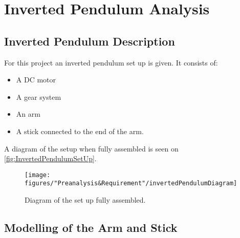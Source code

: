 \chapter{Inverted Pendulum Analysis}


\section{Inverted Pendulum Description}\label{sec:IPDesc}
For this project an inverted pendulum set up is given. It consists of:
\begin{itemize}
	\item A DC motor
	\item A gear system
	\item An arm
	\item A stick connected to the end of the arm.
\end{itemize}
A diagram of the setup when fully assembled is seen on \autoref{fig:InvertedPendulumSetUp}.

\begin{figure} [htbp]
	\centering
	\texttt{[image: figures/"Preanalysis\&Requirement"/invertedPendulumDiagram]}
	\caption{Diagram of the set up fully assembled.} \label{fig:InvertedPendulumSetUp}
\end{figure}




\section{Modelling of the Arm and Stick}\label{sec:StickArm}

